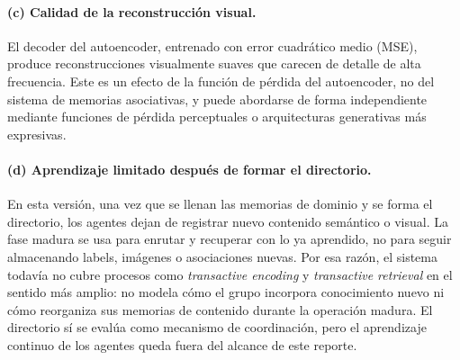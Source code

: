 \paragraph{(c) Calidad de la reconstrucción visual.}
El decoder del autoencoder, entrenado con error cuadrático medio (MSE), produce reconstrucciones visualmente suaves que carecen de detalle de alta frecuencia.
Este es un efecto de la función de pérdida del autoencoder, no del sistema de memorias asociativas, y puede abordarse de forma independiente mediante funciones de pérdida perceptuales o arquitecturas generativas más expresivas.

\paragraph{(d) Aprendizaje limitado después de formar el directorio.}
En esta versión, una vez que se llenan las memorias de dominio y se forma el directorio,
los agentes dejan de registrar nuevo contenido semántico o visual.
La fase madura se usa para enrutar y recuperar con lo ya aprendido, no para seguir
almacenando labels, imágenes o asociaciones nuevas.
Por esa razón, el sistema todavía no cubre procesos como \emph{transactive encoding} y
\emph{transactive retrieval} en el sentido más amplio: no modela cómo el grupo incorpora
conocimiento nuevo ni cómo reorganiza sus memorias de contenido durante la operación
madura.
El directorio sí se evalúa como mecanismo de coordinación, pero el aprendizaje continuo
de los agentes queda fuera del alcance de este reporte.
